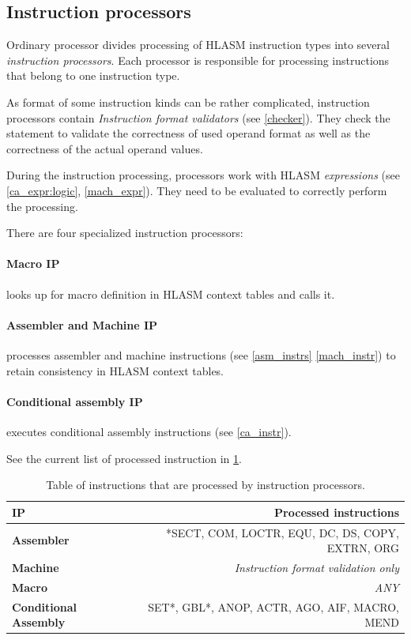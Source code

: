 \subsection{Instruction processors}
\label{lab06:instr_proc}

Ordinary processor divides processing of HLASM instruction types into several \emph{instruction processors}. Each processor is responsible for processing instructions that belong to one instruction type.

As format of some instruction kinds can be rather complicated, instruction processors contain \emph{Instruction format validators} (see \cref{checker}). They check the statement to validate the correctness of used operand format as well as the correctness of the actual operand values.

During the instruction processing, processors work with HLASM \emph{expressions} (see \cref{ca_expr:logic}, \cref{mach_expr}). They need to be evaluated to correctly perform the processing.

There are four specialized instruction processors:
\paragraph*{Macro IP} looks up for macro definition in HLASM context tables and calls it.
\paragraph*{Assembler and Machine IP} processes assembler and machine instructions (see \cref{asm_instrs} \cref{mach_instr}) to retain consistency in HLASM context tables.

\paragraph*{Conditional assembly IP} executes conditional assembly instructions (see \cref{ca_instr}). 

\vspace{5mm}

See the current list of processed instruction in \cref{tab06:instr_proc}.

\begin{table}
	\centering
	\begin{tabular}{lr}
		\textbf{IP}                   &                  \textbf{Processed instructions} \\ \toprule
		\textbf{Assembler}            & *SECT, COM, LOCTR, EQU, DC, DS, COPY, EXTRN, ORG \\
		\textbf{Machine}              &        \emph{Instruction format validation only} \\
		\textbf{Macro}                &                                       \emph{ANY} \\
		\textbf{Conditional Assembly} &    SET*, GBL*, ANOP, ACTR, AGO, AIF, MACRO, MEND \\ \bottomrule
	\end{tabular}
	\caption{Table of instructions that are processed by instruction processors.}
	\label{tab06:instr_proc}
\end{table}

